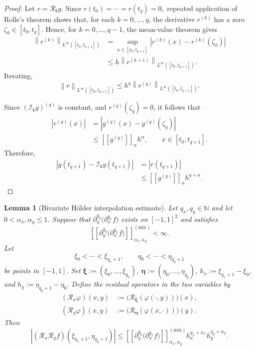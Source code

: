 \documentclass[11pt]{article}
\newtheorem{lemma}[lemma]{Lemma}
\theoremstyle{definition}
\theoremstyle{remark}
\newcommand{\norm}[1]{\left\lVert #1\right\rVert}
\newcommand{\abs}[1]{\left\lvert #1\right\rvert}
\newcommand{\seminorm}[1]{\left[\!\left[ #1\right]\!\right]}
\begin{document}
\begin{proof}
Let $r =\mathcal R_{\mathbf t}g.
$
Since
$
    r(t_0)=\cdots=r(t_q)=0,
$
repeated application of Rolle's theorem shows that, for each
$k=0,\ldots,q$, the derivative $r^{(k)}$ has a zero
$\zeta_k\in[t_0,t_q]$. Hence, for $k=0,\ldots,q-1$, the
mean-value theorem gives
\[
\begin{aligned}
    \norm{r^{(k)}}_{L^\infty([t_0,t_{q+1}])}
    &=
    \sup_{x\in[t_0,t_{q+1}]}
    \abs{r^{(k)}(x)-r^{(k)}(\zeta_k)}\\
    &\le
    h\norm{r^{(k+1)}}_{L^\infty([t_0,t_{q+1}])}.
\end{aligned}
\]
Iterating,
\[
    \norm{r}_{L^\infty([t_0,t_{q+1}])}
    \le
    h^q
    \norm{r^{(q)}}_{L^\infty([t_0,t_{q+1}])}.
\]

Since $(\mathcal I_{\mathbf t}g)^{(q)}$ is constant, and
$r^{(q)}(\zeta_q)=0$, it follows that
\[
\begin{aligned}
    \abs{r^{(q)}(x)}
    &=
    \abs{
      g^{(q)}(x)-g^{(q)}(\zeta_q)
    }\\
    &\le
    \seminorm{g^{(q)}}_{\alpha}h^\alpha,
    \qquad x\in[t_0,t_{q+1}].
\end{aligned}
\]
Therefore,
\[
\begin{aligned}
    \abs{g(t_{q+1})-\mathcal I_{\mathbf t}g(t_{q+1})}
    &=
    \abs{r(t_{q+1})}\\
    &\le
    \seminorm{g^{(q)}}_{\alpha}h^{q+\alpha}.
\end{aligned}
\]
\end{proof}


\begin{lemma}[Bivariate H\"older interpolation estimate]
\label{lem:iterated-holder-interpolation}
Let $q_x,q_y\in\mathbb N$ and let
$0<\alpha_x,\alpha_y\le1$.
Suppose that $
    \partial_y^{q_y}\bigl(\partial_x^{q_x}f\bigr)
$
exists on $[-1,1]^2$ and satisfies
\[
    \seminorm{ \partial_y^{q_y}\bigl(\partial_x^{q_x}f\bigr)}_{\alpha_x,\alpha_y}^{(\mathrm{mix})}<\infty.
\]
Let
\[
    \xi_0<\cdots<\xi_{q_x+1},
    \qquad
    \eta_0<\cdots<\eta_{q_y+1}
\]
be points in $[-1,1]$.
Set $\boldsymbol\xi:=(\xi_0,\ldots,\xi_{q_x})$,
$\boldsymbol\eta:=(\eta_0,\ldots,\eta_{q_y})$,
$h_x:=\xi_{q_x+1}-\xi_0$, and
$h_y:=\eta_{q_y+1}-\eta_0$.
Define the residual operators in the two variables by
\[
\begin{aligned}
    (\mathcal R_x\varphi)(x,y)
    &:=
    \bigl(
      \mathcal R_{\boldsymbol\xi}(\varphi(\cdot,y))
    \bigr)(x),\\
    (\mathcal R_y\varphi)(x,y)
    &:=
    \bigl(
      \mathcal R_{\boldsymbol\eta}(\varphi(x,\cdot))
    \bigr)(y).
\end{aligned}
\]
Then
\begin{equation*}
    \abs{
      (\mathcal R_x\mathcal R_y f)
      (\xi_{q_x+1},\eta_{q_y+1})
    }
    \le
    \seminorm{
      \partial_y^{q_y}\bigl(\partial_x^{q_x}f\bigr)
    }_{\alpha_x,\alpha_y}^{(\mathrm{mix})}
    h_x^{q_x+\alpha_x}h_y^{q_y+\alpha_y}.
\end{equation*}
\end{lemma}
\end{document}
